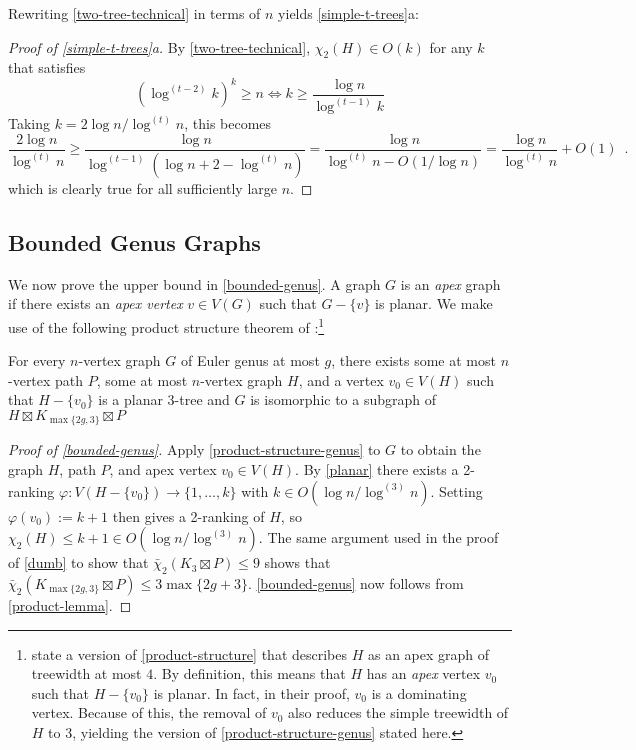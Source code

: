 \documentclass[kpfonts]{patmorin}
\newcommand{\trn}{\chi_2}
\newcommand{\dtcn}{\bar{\chi}_2}
\theoremstyle{named}
\newcommand{\weirdref}[2]{\cref{#1}#2}
\begin{document}
Rewriting \cref{two-tree-technical} in terms of $n$ yields \weirdref{simple-t-trees}{a}:

\begin{proof}[Proof of \weirdref{simple-t-trees}{a}]
    By \cref{two-tree-technical}, $\trn(H)\in O(k)$ for any $k$ that satisfies
    \[  (\log^{(t-2)} k)^{k} \ge n \Leftrightarrow
        k \ge \frac{\log n}{\log^{(t-1)} k}
    \]
    Taking $k=2\log n/\log^{(t)} n$, this becomes
    \[
        \frac{2\log n}{\log^{(t)} n}
        \ge \frac{\log n}{\log^{(t-1)}(\log n + 2 -\log^{(t)} n)}
        = \frac{\log n}{\log^{(t)} n - O(1/\log n)}
        = \frac{\log n}{\log^{(t)} n}+O(1) \enspace .
    \]
    which is clearly true for all sufficiently large $n$.
\end{proof}


\subsection{Bounded Genus Graphs}

We now prove the upper bound in \cref{bounded-genus}. A graph $G$ is an \emph{apex} graph if there exists an \emph{apex vertex} $v\in V(G)$ such that $G-\{v\}$ is planar. We make use of the following product structure theorem of \citet{dujmovic.joret.ea:planar}:\footnote{\citet{dujmovic.joret.ea:planar} state a version of \cref{product-structure} that describes $H$ as an apex graph of treewidth at most $4$.  By definition, this means that $H$ has an \emph{apex} vertex $v_0$ such that $H-\{v_0\}$ is planar.  In fact, in their proof, $v_0$ is a dominating vertex.  Because of this, the removal of $v_0$ also reduces the simple treewidth of $H$ to 3, yielding the version of \cref{product-structure-genus} stated here.}

\begin{thm} \label{product-structure-genus}
    For every $n$-vertex graph $G$ of Euler genus at most $g$, there exists some at most $n$-vertex path $P$, some at most $n$-vertex graph $H$, and a vertex $v_0\in V(H)$ such that $H-\{v_0\}$ is a planar 3-tree and $G$ is isomorphic to a subgraph of $H\boxtimes K_{\max\{2g,3\}}\boxtimes P$
\end{thm}

\begin{proof}[Proof of \cref{bounded-genus}]
    Apply \cref{product-structure-genus} to $G$ to obtain the graph $H$, path $P$, and apex vertex $v_0\in V(H)$.  By \cref{planar} there exists a 2-ranking $\varphi:V(H-\{v_0\})\to \{1,\ldots,k\}$ with $k\in O(\log n/\log^{(3)} n)$. Setting $\varphi(v_0):=k+1$ then gives a 2-ranking of $H$, so $\trn(H)\le k+1\in O(\log n/\log^{(3)} n)$.  The same argument used in the proof of \cref{dumb} to show that $\dtcn(K_3\boxtimes P)\le 9$ shows that $\dtcn(K_{\max\{2g,3\}}\boxtimes P)\le 3\max\{2g+3\}$.  \cref{bounded-genus} now follows from \cref{product-lemma}.
\end{proof}
\end{document}
